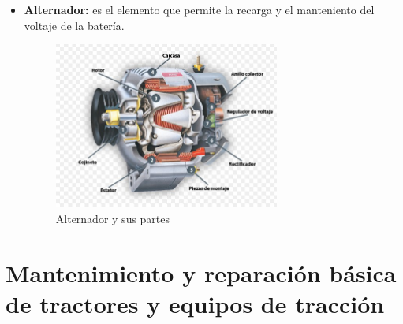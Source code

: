 \documentclass[a4paper,12pt,oneside]{book}
\begin{document}
\begin{itemize}
\item \textbf{Alternador:} es el elemento que permite la recarga y el manteniento del
voltaje de la batería.

\begin{figure}[!ht]
\centering
\includegraphics[width=0.7\textwidth]{./img_0009/alternador.jpg}
\caption{Alternador y sus partes}
\end{figure}
\end{itemize}

\chapter{Mantenimiento y reparación básica de tractores y equipos de tracción}
\label{sec:orgd97bf50}
\end{document}
